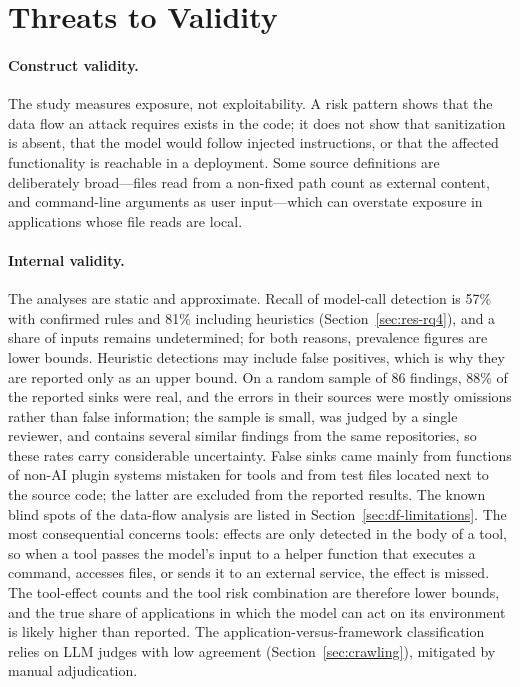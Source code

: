 \section{Threats to Validity}
\label{sec:disc-threats}

\paragraph{Construct validity.} The study measures exposure, not exploitability. A risk pattern shows that the data flow an attack requires exists in the code; it does not show that sanitization is absent, that the model would follow injected instructions, or that the affected functionality is reachable in a deployment. Some source definitions are deliberately broad---files read from a non-fixed path count as external content, and command-line arguments as user input---which can overstate exposure in applications whose file reads are local.

\paragraph{Internal validity.} The analyses are static and approximate. Recall of model-call detection is 57\% with confirmed rules and 81\% including heuristics (Section~\ref{sec:res-rq4}), and a share of inputs remains undetermined; for both reasons, prevalence figures are lower bounds. Heuristic detections may include false positives, which is why they are reported only as an upper bound. On a random sample of 86 findings, 88\% of the reported sinks were real, and the errors in their sources were mostly omissions rather than false information; the sample is small, was judged by a single reviewer, and contains several similar findings from the same repositories, so these rates carry considerable uncertainty. False sinks came mainly from functions of non-AI plugin systems mistaken for tools and from test files located next to the source code; the latter are excluded from the reported results. The known blind spots of the data-flow analysis are listed in Section~\ref{sec:df-limitations}. The most consequential concerns tools: effects are only detected in the body of a tool, so when a tool passes the model's input to a helper function that executes a command, accesses files, or sends it to an external service, the effect is missed. The tool-effect counts and the tool risk combination are therefore lower bounds, and the true share of applications in which the model can act on its environment is likely higher than reported. The application-versus-framework classification relies on LLM judges with low agreement (Section~\ref{sec:crawling}), mitigated by manual adjudication.

